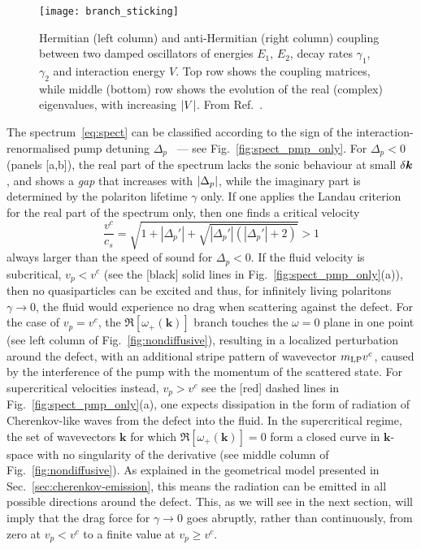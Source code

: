 %
\begin{figure}[tb]\centering
  \texttt{[image: branch\_sticking]}
  \caption{
    Hermitian (left column) and anti-Hermitian (right column) coupling
    between two damped oscillators of energies $E_1$, $E_2$, decay rates
    $\gamma_1$, $\gamma_2$ and interaction energy $V$. Top row shows the
    coupling matrices, while middle (bottom) row shows the evolution of
    the real (complex) eigenvalues, with increasing $\vert V \vert$. From
    Ref.~\cite{Ciuti_2003}.
  }\label{fig:branch-stick}
\end{figure}
% 

The spectrum~\eqref{eq:spect} can be classified according to the sign
of the interaction-renormalised pump detuning
$\Delta_p$~\cite{Carusotto_2004,Ciuti_2005} --- see
Fig.~\ref{fig:spect_pmp_only}. For $\Delta_p<0$ (panels [a,b]), the
real part of the spectrum lacks the sonic behaviour at small
$\delta \bm{k}$, and shows a \emph{gap} that increases with
$\vert \Delta_p \vert$, while the imaginary part is determined by the
polariton lifetime $\gamma$ only.
%
If one applies the Landau criterion for the real part
of the spectrum only, then one finds a critical velocity
%
\begin{equation}
  \frac{v^c}{c_s} = \sqrt{1 + |\Delta_p'| +
    \sqrt{|\Delta_p'|(|\Delta_p'| + 2)}} > 1
\label{eq:criti}
\end{equation}
%
always larger than the speed of sound for $\Delta_p<0$. 
%
If the fluid velocity is subcritical, $v_p<v^c$ (see the [black] solid
lines in Fig.~\ref{fig:spect_pmp_only}(a)), then no quasiparticles can
be excited and thus, for infinitely living polaritons $\gamma \to 0$,
the fluid would experience no drag when scattering against the
defect. 
%
For the case of $v_p = v^c$, the $\Re[\omega_{+}(\bm{k})]$ branch
touches the $\omega = 0$ plane in one point (see left column of
Fig.~\ref{fig:nondiffusive}), resulting in a localized perturbation
around the defect, with an additional stripe pattern of wavevector
$m_{\text{LP}}v^c$, caused by the interference of the pump with the momentum of
the scattered state.
%
For supercritical velocities instead, $v_p > v^c$ see the [red] dashed
lines in Fig.~\ref{fig:spect_pmp_only}(a), one expects dissipation in
the form of radiation of Cherenkov-like waves from the defect into the
fluid. In the supercritical regime, the set of wavevectors $\bm{k}$
for which $\Re[\omega_{+} (\bm{k})] = 0$ form a closed curve in
$\bm{k}$-space with no singularity of the derivative (see middle
column of Fig.~\ref{fig:nondiffusive}). As explained in the
geometrical model presented in Sec.~\ref{sec:cherenkov-emission}, this
means the radiation can be emitted in all possible directions around
the defect. This, as we will see in the next section, will imply that
the drag force for $\gamma \to 0$ goes abruptly, rather than
continuously, from zero at $v_p<v^c$ to a finite value at
$v_p \ge v^c$.

